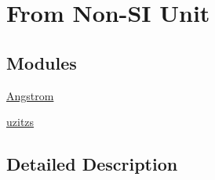 \hypertarget{group___e_g_x_math-_conversions-_length_conversions-_non-_s_i}{}\section{From Non-\/\+SI Unit}
\label{group___e_g_x_math-_conversions-_length_conversions-_non-_s_i}
\subsection*{Modules}
\begin{DoxyCompactItemize}
\item 
\mbox{\hyperlink{group___e_g_x_math-_conversions-_length_conversions-_non-_s_i-_angstrom}{Angstrom}}
\item 
\mbox{\hyperlink{group___e_g_x_math-_conversions-_length_conversions-_non-_s_i-uzitzs}{uzitzs}}
\end{DoxyCompactItemize}


\subsection{Detailed Description}
